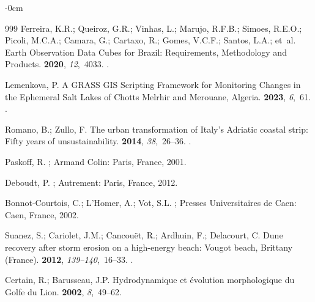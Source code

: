 \documentclass[coasts,article,accept,pdftex,moreauthors]{Definitions/mdpi}
\begin{document}
\begin{adjustwidth}{-\extralength}{0cm}
\begin{thebibliography}{999}
Ferreira, K.R.; Queiroz, G.R.; Vinhas, L.; Marujo, R.F.B.; Simoes, R.E.O.;
  Picoli, M.C.A.; Camara, G.; Cartaxo, R.; Gomes, V.C.F.; Santos, L.A.; et~al.
\newblock Earth Observation Data Cubes for {Brazil}: {R}equirements, Methodology
  and Products.
 {\bf 2020}, {\em 12},~4033.
.

Lemenkova, P.
\newblock A {GRASS GIS} Scripting Framework for Monitoring Changes in the
  Ephemeral Salt Lakes of {Chotts Melrhir} and {Merouane}, {Algeria}.
 {\bf 2023}, {\em 6},~61.
.

Romano, B.; Zullo, F.
\newblock The urban transformation of {Italy}'s {Adriatic} coastal strip:
  {F}ifty years of unsustainability.
 {\bf 2014}, {\em 38},~26--36.
.

Paskoff, R.
; Armand
  Colin: Paris, France, 2001.

Deboudt, P.
; Autrement: Paris, France,  2012.

Bonnot-Courtois, C.; L'Homer, A.; Vot, S.L.
; Presses
  Universitaires de Caen: Caen, France,   2002.

Suanez, S.; Cariolet, J.M.; Cancou\"et, R.; Ardhuin, F.; Delacourt, C.
\newblock Dune recovery after storm erosion on a high-energy beach: {V}ougot
  beach, {Brittany} ({France}).
 {\bf 2012}, {\em 139--140},~16--33.
.

Certain, R.; Barusseau, J.P.
\newblock Hydrodynamique et évolution morphologique du Golfe du Lion.
 {\bf 2002},
  {\em 8},~49--62.


\end{thebibliography}
\end{adjustwidth}
\end{document}

